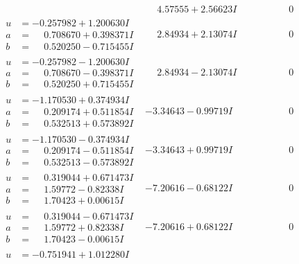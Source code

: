 \documentclass[1p]{elsarticle_modified}
\theoremstyle{definition}
\begin{document}
$$\begin{array}{c|c|c}
 & \phantom{-}4.57555 + 2.56623 I & \phantom{-0.000000 } 0 \\ \hline\begin{aligned}
u &= -0.257982 + 1.200630 I \\
a &= \phantom{-}0.708670 + 0.398371 I \\
b &= \phantom{-}0.520250 - 0.715455 I\end{aligned}
 & \phantom{-}2.84934 + 2.13074 I & \phantom{-0.000000 } 0 \\ \hline\begin{aligned}
u &= -0.257982 - 1.200630 I \\
a &= \phantom{-}0.708670 - 0.398371 I \\
b &= \phantom{-}0.520250 + 0.715455 I\end{aligned}
 & \phantom{-}2.84934 - 2.13074 I & \phantom{-0.000000 } 0 \\ \hline\begin{aligned}
u &= -1.170530 + 0.374934 I \\
a &= \phantom{-}0.209174 + 0.511854 I \\
b &= \phantom{-}0.532513 + 0.573892 I\end{aligned}
 & -3.34643 - 0.99719 I & \phantom{-0.000000 } 0 \\ \hline\begin{aligned}
u &= -1.170530 - 0.374934 I \\
a &= \phantom{-}0.209174 - 0.511854 I \\
b &= \phantom{-}0.532513 - 0.573892 I\end{aligned}
 & -3.34643 + 0.99719 I & \phantom{-0.000000 } 0 \\ \hline\begin{aligned}
u &= \phantom{-}0.319044 + 0.671473 I \\
a &= \phantom{-}1.59772 - 0.82338 I \\
b &= \phantom{-}1.70423 + 0.00615 I\end{aligned}
 & -7.20616 - 0.68122 I & \phantom{-0.000000 } 0 \\ \hline\begin{aligned}
u &= \phantom{-}0.319044 - 0.671473 I \\
a &= \phantom{-}1.59772 + 0.82338 I \\
b &= \phantom{-}1.70423 - 0.00615 I\end{aligned}
 & -7.20616 + 0.68122 I & \phantom{-0.000000 } 0 \\ \hline\begin{aligned}
u &= -0.751941 + 1.012280 I \\

\end{aligned}
\end{array}$$
\end{document}
